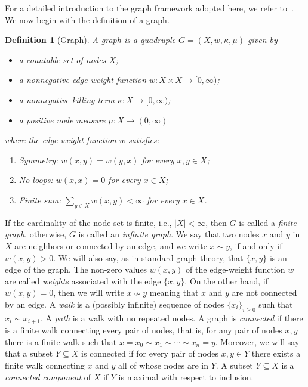 \documentclass[journal]{article}
\theoremstyle{nonitalic}
\theoremstyle{nonitalic}
\theoremstyle{plain} %
\newtheorem{definition}[theorem]{Definition}
\numberwithin{equation}{section}
\begin{document}
For a detailed introduction to the graph framework adopted here, we refer to~\cite{keller2021graphs}. We now begin with the definition of a graph.
\begin{definition}[Graph]
A \textit{graph} is a quadruple $G=(X,w,\kappa,\mu)$ given by
\begin{itemize}
	\item  a countable set of \emph{nodes} $X$;
	\item a nonnegative \emph{edge-weight} function $w\colon X\times X \to [0,\infty)$;
	\item  a nonnegative \emph{killing term} $\kappa \colon X \to [0,\infty)$;
	\item a positive \emph{node measure} $\mu \colon X \to (0,\infty)$
\end{itemize}
where the edge-weight function $w$ satisfies:
\begin{enumerate}[label={\upshape(\bfseries A\arabic*)},wide = 0pt, leftmargin = 3em]
	\item\label{assumption:symmetry} Symmetry: $w(x,y)=w(y,x)$ for every $x,y \in X$;
	\item\label{assumption:loops} No loops: $w(x,x)=0$ for every $x \in X$;
	\item\label{assumption:degree} Finite sum: $\sum_{y\in X} w(x,y) < \infty$ for every $x \in X$.
\end{enumerate}
\end{definition}

If the cardinality of the node set is finite, i.e., $|X|<\infty$, then $G$ is called a \emph{finite graph}, otherwise, $G$ is called an \emph{infinite graph}. We say that two nodes $x$ and $y$ in $X$ are neighbors or connected by an edge, and we write $x\sim y$, if and only if $w(x,y)>0$. We will also say, as in standard graph theory, that $\{x,y\}$ is an edge of the graph. The non-zero values $w(x,y)$ of the edge-weight function $w$ are called \emph{weights} associated with the edge $\{x,y\}$. On the other hand, if $w(x,y)=0$, then we will write $x\nsim y$ meaning that $x$ and $y$ are not connected by an edge. A \emph{walk} is a (possibly infinite) sequence of nodes $\{x_{i}\}_{i\geq 0}$ such that $x_{i}\sim x_{i+1}$. A \emph{path}
is a walk with no repeated nodes.  A graph is \emph{connected}
if there is a finite walk connecting every pair of nodes, that is, for any pair of nodes $x, y$ there is a finite walk such that $x = x_{0}\sim x_{1}\sim\cdots\sim x_{n}=y$. Moreover, we will say that a subset $Y \subseteq X$  is connected if for every pair of nodes $x,y \in Y$ there exists a finite walk connecting $x$ and $y$ all of whose nodes are in $Y$. A subset $Y \subseteq X$ is a \emph{connected component} of $X$ if $Y$ is maximal with respect to inclusion.
\end{document}
